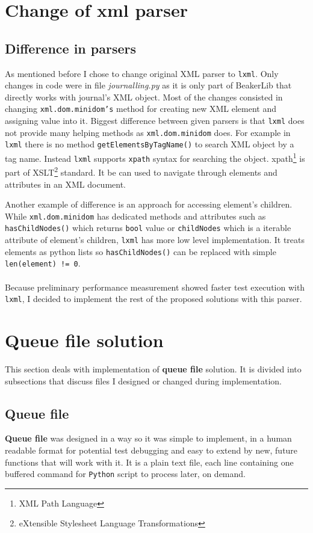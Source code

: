 \section{Change of xml parser}
\subsection{Difference in parsers}
As mentioned before I chose to change original XML parser to \texttt{lxml}. Only changes in code were in file \textit{journalling.py} as it is only part of BeakerLib that directly works with journal's XML object. 
Most of the changes consisted in changing \texttt{xml.dom.minidom's} method for creating new XML element and assigning value into it.
Biggest difference between given parsers is that \texttt{lxml} does not provide many helping methods as \texttt{xml.dom.minidom} does.
For example in \texttt{lxml}  there is no method \texttt{getElementsByTagName()} to search XML object by a tag name. Instead \texttt{lxml} supports \texttt{xpath} \cite{xpath} syntax for searching the object. xpath\footnote{XML Path Language} is part of XSLT\footnote{eXtensible Stylesheet Language Transformations} standard. It be can used to navigate through elements and attributes in an XML document.

Another example of difference is an approach for accessing element's children. While \texttt{xml.dom.minidom} has dedicated methods and attributes such as \texttt{hasChildNodes()} which returns \texttt{bool} value or \texttt{childNodes} which is a iterable attribute of element's children, \texttt{lxml} has more low level implementation. It treats elements as python lists so \texttt{hasChildNodes()} can be replaced with simple \texttt{len(element) != 0}.
\\
\\
Because preliminary performance measurement showed faster test execution with \texttt{lxml}, I decided to implement the rest of the proposed solutions with this parser.

\section{Queue file solution}
This section deals with implementation of \textbf{queue file} solution. It is divided into subsections that discuss files I designed or changed during implementation. 

\subsection{Queue file}
\textbf{Queue file} was designed in a way so it was simple to implement, in a human readable format for potential test debugging and easy to extend by new, future functions that will work with it. 
It is a plain text file, each line containing one buffered command for \texttt{Python} script to process later, on demand. 

